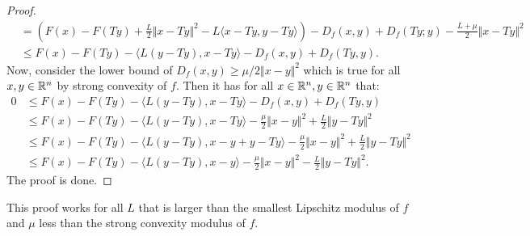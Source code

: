 \documentclass[12pt]{article}
\begin{document}
\begin{proof}
{\begin{align*}
            & = 
            \left(
                F(x) - F(Ty) + \frac{L}{2}\Vert x - Ty\Vert^2 
                - L\langle  x - Ty, y - Ty\rangle
            \right)
            - D_f(x, y) 
            + D_f(Ty; y)
            - \frac{L + \mu}{2}\Vert x - Ty\Vert^2
            \\
            &\le 
            F(x) - F(Ty)
            - \langle L(y - Ty), x - Ty\rangle
            - D_f(x, y) 
            + D_f(Ty, y). 
        \end{align*}
        }
        Now, consider the lower bound of $D_f(x, y) \ge \mu/2\Vert x - y\Vert^2$ which is true for all $x, y \in \mathbb R^n$ by strong convexity of $f$. 
        Then it has for all $x \in \mathbb R^n, y \in \mathbb R^n$ that: 
        \begin{align*}
            0 &\le 
            F(x) - F(Ty)
            - \langle L(y - Ty), x - Ty\rangle
            - D_f(x, y) 
            + D_f(Ty, y)
            \\
            &\le 
            F(x) - F(Ty)
            - \langle L(y - Ty), x - Ty\rangle
            - \frac{\mu}{2}\Vert x - y\Vert^2
            + \frac{L}{2}\Vert y - Ty\Vert^2
            \\
            &\le 
            F(x) - F(Ty)
            - \langle L(y - Ty), x - y  + y - Ty\rangle
            - \frac{\mu}{2}\Vert x - y\Vert^2
            + \frac{L}{2}\Vert y - Ty\Vert^2
            \\
            &\le 
            F(x) - F(Ty) - \langle L(y - Ty), x - y\rangle - \frac{\mu}{2}\Vert x - y \Vert^2
            - \frac{L}{2}\Vert y - Ty\Vert^2. 
        \end{align*}
        The proof is done. 
    \end{proof}
    \begin{remark}
        This proof works for all $L$ that is larger than the smallest Lipschitz modulus of $f$ and $\mu$ less than the strong convexity modulus of $f$. 
    \end{remark}
\end{document}
